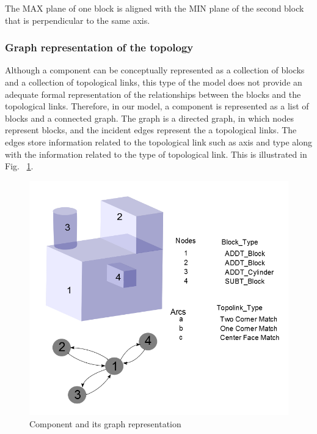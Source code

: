 \begin{enumerate}
		The MAX plane of one block is aligned with the MIN plane of the second 
        block that is perpendicular to the same axis.


	\end{enumerate}

	\subsubsection{Graph representation of the topology}

		Although a component can be conceptually represented as a collection of 
		blocks and a collection of topological links, this type of the model
		does not provide an adequate formal representation of the relationships 
		between the blocks and the topological links. Therefore, in our model,
		a component is represented as a list of blocks and a connected graph. 
		The graph is a directed graph, in which nodes represent blocks,
		and the incident edges represent the a topological links.
		The edges store information related to the topological link such as
		axis and type along with the information related to the type of 
		topological link. This is illustrated in Fig. ~\ref{compexa}.

        \begin{figure}[htbp]
	\includegraphics[scale=0.6]{compexa.png}
            \caption{Component and its graph representation}
            \label{compexa}
        \end{figure}




